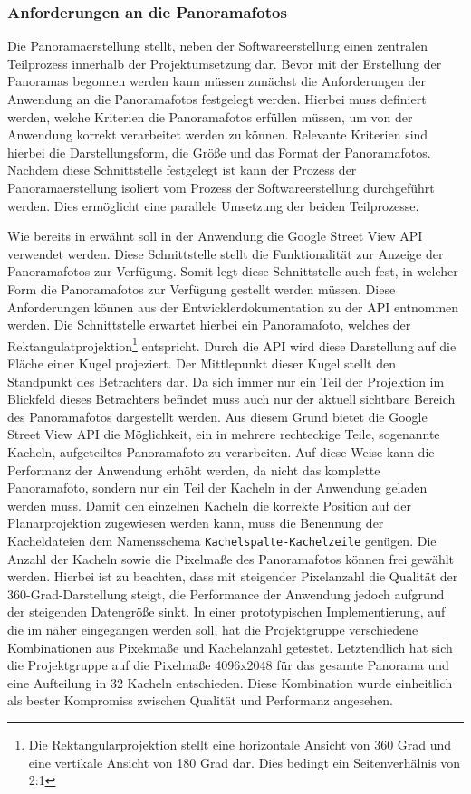 \subsubsection{Anforderungen an die Panoramafotos}
\label{sec:PanoramaerstellungAnforderungen}

Die Panoramaerstellung stellt, neben der Softwareerstellung einen zentralen
Teilprozess innerhalb der Projektumsetzung dar. Bevor mit der Erstellung der
Panoramas begonnen werden kann müssen zunächst die Anforderungen der Anwendung
an die Panoramafotos festgelegt werden. Hierbei muss definiert werden, welche
Kriterien die Panoramafotos erfüllen müssen, um von der Anwendung korrekt
verarbeitet werden zu können. Relevante Kriterien sind hierbei die
Darstellungsform, die Größe und das Format der Panoramafotos. Nachdem diese
Schnittstelle festgelegt ist kann der Prozess der Panoramaerstellung isoliert
vom Prozess der Softwareerstellung durchgeführt werden. Dies ermöglicht eine
parallele Umsetzung der beiden Teilprozesse.

Wie bereits in  erwähnt soll in der Anwendung die Google
Street View API verwendet werden. Diese Schnittstelle stellt die Funktionalität
zur Anzeige der Panoramafotos zur Verfügung. Somit legt diese Schnittstelle auch
fest, in welcher Form die Panoramafotos zur Verfügung gestellt werden müssen.
Diese Anforderungen können aus der Entwicklerdokumentation zu der API entnommen
werden. Die Schnittstelle erwartet hierbei ein Panoramafoto, welches der
Rektangulatprojektion\footnote{Die Rektangularprojektion stellt eine
horizontale Ansicht von 360 Grad und eine vertikale Ansicht von 180 Grad dar.
Dies bedingt ein Seitenverhälnis von 2:1} entspricht. Durch die API wird diese
Darstellung auf die Fläche einer Kugel projeziert. Der Mittlepunkt dieser Kugel
stellt den Standpunkt des Betrachters dar. Da sich immer nur ein Teil der
Projektion im Blickfeld dieses Betrachters befindet muss auch nur der aktuell
sichtbare Bereich des Panoramafotos dargestellt werden. Aus diesem Grund bietet
die Google Street View API die Möglichkeit, ein in mehrere rechteckige Teile,
sogenannte Kacheln, aufgeteiltes Panoramafoto zu verarbeiten. Auf diese Weise
kann die Performanz der Anwendung erhöht werden, da nicht das komplette
Panoramafoto, sondern nur ein Teil der Kacheln in der Anwendung geladen werden
muss. Damit den einzelnen Kacheln die korrekte Position auf der Planarprojektion
zugewiesen werden kann, muss die Benennung der Kacheldateien dem Namensschema
\texttt{Kachelspalte-Kachelzeile} genügen. Die Anzahl der Kacheln sowie die
Pixelmaße des Panoramafotos können frei gewählt werden. Hierbei ist zu beachten,
dass mit steigender Pixelanzahl die Qualität der 360-Grad-Darstellung steigt,
die Performance der Anwendung jedoch aufgrund der steigenden Datengröße sinkt.
In einer prototypischen Implementierung, auf die im 
näher eingegangen werden soll, hat die Projektgruppe verschiedene Kombinationen
aus Pixekmaße und Kachelanzahl getestet. Letztendlich hat sich die Projektgruppe
auf die Pixelmaße 4096x2048 für das gesamte Panorama und eine Aufteilung in 32
Kacheln entschieden. Diese Kombination wurde einheitlich als bester Kompromiss
zwischen Qualität und Performanz angesehen.